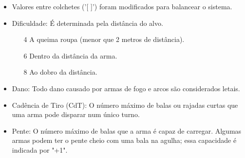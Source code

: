 \begin{itemize}[noitemsep]

\item Valores entre colchetes ('[ ]') foram modificados para balancear o sistema.

\item Dificuldade: É determinada pela distância do alvo.
\begin{itemize}[noitemsep]
  \item [4] A queima roupa (menor que 2 metros de distância).
  \item [6] Dentro da distância da arma.
  \item [8] Ao dobro da distância.
\end{itemize}

\item Dano: Todo dano causado por armas de fogo e arcos são considerados letais.

\item Cadência de Tiro (CdT): O número máximo de balas ou rajadas curtas que uma arma pode disparar num único turno.

\item Pente: O número máximo de balas que a arma é capaz de carregar. Algumas armas podem ter o pente cheio com uma bala na agulha; essa capacidade é indicada por "+1".



\end{itemize}
